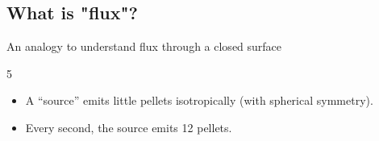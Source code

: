 \documentclass[aspectratio=169,
hyperref={colorlinks,urlcolor=blue}
]{beamer}
\begin{document}
\subsection{What is "flux"?}
\label{subsec:whatisflux}
\begin{frame}{An analogy to understand flux through a closed surface}

\begin{center}

\begin{animateinline}{5} %

\end{animateinline}
\end{center}


 \begin{itemize}
 \item A ``source'' emits little pellets isotropically (with spherical symmetry).
 \item Every second, the source emits 12 pellets.
 \end{itemize}
\end{frame}


\end{document}
